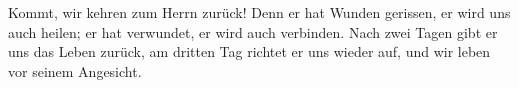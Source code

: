 \lettrine[lines=3]{K}{}ommt, wir kehren zum Herrn zurück! Denn er hat Wunden gerissen, er wird uns auch heilen; er hat verwundet, er wird auch verbinden. Nach zwei Tagen gibt er uns das Leben zurück, am dritten Tag richtet er uns wieder auf, und wir leben vor seinem Angesicht.
